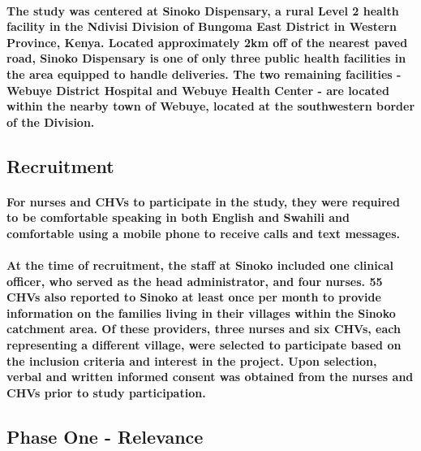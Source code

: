 \paragraph{The study was centered at Sinoko Dispensary, a rural Level 2 health facility in the Ndivisi Division of Bungoma East District in Western Province, Kenya. Located approximately 2km off of the nearest paved road, Sinoko Dispensary is one of only three public health facilities in the area  equipped to handle deliveries. The two remaining facilities - Webuye District Hospital and Webuye Health Center - are located within the nearby town of Webuye, located at the southwestern border of the Division.}

\subsection{Recruitment}
\paragraph{For nurses and CHVs to participate in the study, they were required to be comfortable speaking in both English and Swahili and comfortable using a mobile phone to receive calls and text messages.}

\paragraph{At the time of recruitment, the staff at Sinoko included one clinical officer, who served as the head administrator, and four nurses. 55 CHVs also reported to Sinoko at least once per month to provide information on the families living in their villages within the Sinoko catchment area. Of these providers, three nurses and six CHVs, each representing a different village, were selected to participate based on the inclusion criteria and interest in the project. Upon selection, verbal and written informed consent was obtained from the nurses and CHVs prior to study participation.}

\subsection{Phase One - Relevance}
